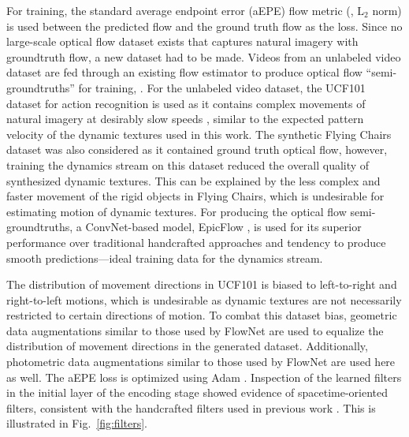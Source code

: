 For training, the standard average
endpoint error (aEPE) flow metric (\ie, $\text{L}_2$
norm) is used between the predicted flow and the ground truth
flow as the loss.
Since no large-scale optical flow dataset exists that captures
natural imagery with groundtruth flow, a new dataset had to be made. Videos
from an unlabeled video dataset are fed through an existing flow
estimator to produce optical
flow ``semi-groundtruths'' for training,
\cf \cite{tran2016}.
For the unlabeled video dataset, the UCF101
dataset for action recognition \cite{soomro2012ucf101} is used as it contains complex movements of natural imagery at desirably slow speeds , similar to the expected pattern velocity of the dynamic textures used in this work. The synthetic Flying Chairs dataset \cite{dosovitskiy2015} was also considered as it contained ground truth optical flow, however, training the dynamics stream on this dataset reduced the overall quality of synthesized dynamic textures. This can be explained by the less complex and faster movement of the rigid objects in Flying Chairs, which is undesirable for estimating motion of dynamic textures.
For producing the optical flow semi-groundtruths, a ConvNet-based model, EpicFlow \cite{revaud2015epicflow}, is used for 
its superior performance over traditional handcrafted approaches and tendency
to produce smooth predictions---ideal training data for the dynamics stream. 

The distribution of movement directions  in UCF101 is biased to left-to-right and right-to-left motions, which is undesirable as dynamic textures are not necessarily restricted to certain directions of motion. To combat this dataset bias, geometric data augmentations  similar to those used by FlowNet \cite{dosovitskiy2015} are used to equalize the distribution of movement directions in the generated dataset. Additionally, photometric data augmentations  similar to those used by FlowNet \cite{dosovitskiy2015} are used here as well. The aEPE loss is optimized using Adam \cite{kingma2017}.
Inspection of the learned filters in the initial layer of the encoding stage
showed evidence of spacetime-oriented filters, consistent with
the handcrafted filters used in previous work \cite{derpanis2012spacetime}. This is illustrated in Fig.\ \ref{fig:filters}.



